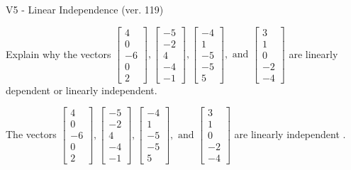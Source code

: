 \begin{exercise}
  \begin{exerciseTitle}V5 - Linear Independence (ver. 119)\end{exerciseTitle}
  \begin{exerciseStatement}
    Explain why the vectors \(\left[\begin{array}{r}
4 \\
0 \\
-6 \\
0 \\
2
\end{array}\right] , \left[\begin{array}{r}
-5 \\
-2 \\
4 \\
-4 \\
-1
\end{array}\right] , \left[\begin{array}{r}
-4 \\
1 \\
-5 \\
-5 \\
5
\end{array}\right] , \text{ and } \left[\begin{array}{r}
3 \\
1 \\
0 \\
-2 \\
-4
\end{array}\right]\) are linearly dependent or linearly independent.	


  \end{exerciseStatement}
  \begin{exerciseAnswer}
   The vectors \(\left[\begin{array}{r}
4 \\
0 \\
-6 \\
0 \\
2
\end{array}\right] , \left[\begin{array}{r}
-5 \\
-2 \\
4 \\
-4 \\
-1
\end{array}\right] , \left[\begin{array}{r}
-4 \\
1 \\
-5 \\
-5 \\
5
\end{array}\right] , \text{ and } \left[\begin{array}{r}
3 \\
1 \\
0 \\
-2 \\
-4
\end{array}\right]\) are 
  	 linearly independent  .
  


  \end{exerciseAnswer}
\end{exercise}